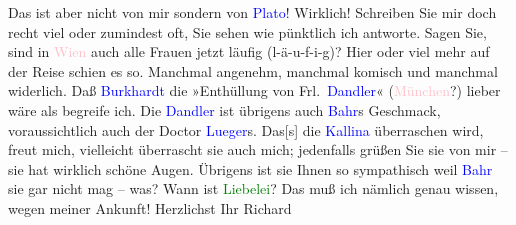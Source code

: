            Das ist aber nicht von mir sondern von \textcolor{blue}{Plato}{}\ledrightnote{\textcolor{blue}{Platon}}!
               Wirklich! \pend
           \pstart
           Schreiben Sie mir doch recht viel oder zumindest oft, Sie sehen wie pünktlich ich
               antworte. Sagen Sie, sind in \textcolor{pink}{Wien}{}\ledrightnote{\textcolor{pink}{Wien}} auch alle Frauen
               jetzt läufig (l-ä-u-f-i-g)? {\pb}Hier
                   oder viel mehr auf der Reise schien es so.
               Manchmal angenehm, manchmal komisch und manchmal widerlich.\pend
           \pstart
           Daß \textcolor{blue}{Burkhardt}{}\ledrightnote{\textcolor{blue}{Max Eugen Burckhard}} die »Enthüllung von Frl. \textcolor{blue}{Dandler}{}\ledrightnote{\textcolor{blue}{Anna Dandler}}« (\textcolor{pink}{München}{}\ledrightnote{\textcolor{pink}{München}}?) lieber wäre als \label{K_L00492_2v}\label{K_L00492_2h} begreife
               ich. Die \textcolor{blue}{Dandler}{}\ledrightnote{\textcolor{blue}{Anna Dandler}} ist übrigens {\pb}auch \textcolor{blue}{Bahr}{}\ledrightnote{\textcolor{blue}{Hermann Bahr}}s Geschmack, voraussichtlich auch der Doctor \textcolor{blue}{Lueger}{}\ledrightnote{\textcolor{blue}{Karl Lueger}}s. Das{[}s{]} die \textcolor{blue}{Kallina}{}\ledrightnote{\textcolor{blue}{Anna Kallina}} überraschen wird, freut mich, vielleicht überrascht sie
               auch mich; jedenfalls grüßen Sie sie von mir – sie hat wirklich schöne Augen.
               Übrigens ist sie Ihnen so sympathisch weil \textcolor{blue}{Bahr}{}\ledrightnote{\textcolor{blue}{Hermann Bahr}}
               sie gar nicht mag – was? Wann ist \textcolor{green}{Liebelei}{}\ledrightnote{\textcolor{green}{Liebelei. Schauspiel in drei Akten}}? Das muß
               ich nämlich genau wissen, wegen meiner Ankunft!\pend
           \pstart Herzlichst Ihr \spacefill\mbox{Richard}\pend{}\endnumbering{}  
      